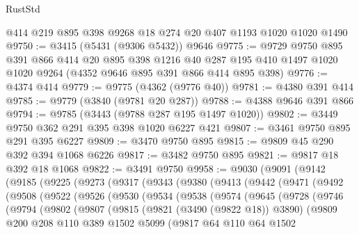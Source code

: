 \begin{lexlean}{RustStd}
\begin{coremodule}
{\begin{coremodule}
{{{{{{{{{{{{{{{{{{{{{{{{{{    @414
    @219
    @895
    @398
    @9268
    @18
    @274
    @20
    @407
    @1193
    @1020
    @1020
    @1490
@9750 := @3415 (@5431 (@9306 @5432)) @9646
@9775 := @9729
    @9750
    @895
    @391
    @866
    @414
    @20
    @895
    @398
    @1216
    @40
    @287
    @195
    @410
    @1497
    @1020
    @1020
    @9264
    (@4352 @9646 @895 @391 @866 @414 @895 @398)
@9776 := @4374 @414
@9779 := @9775 (@4362 (@9776 @40))
@9781 := @4380 @391 @414
@9785 := @9779 (@3840 (@9781 @20 @287))
@9788 := @4388 @9646 @391 @866
@9794 := @9785 (@3443 (@9788 @287 @195 @1497 @1020))
@9802 := @3449 @9750 @362 @291 @395 @398 @1020 @6227 @421
@9807 := @3461 @9750 @895 @291 @395 @6227
@9809 := @3470 @9750 @895
@9815 := @9809 @45 @290 @392 @394 @1068 @6226
@9817 := @3482 @9750 @895
@9821 := @9817 @18 @392 @18 @1068
@9822 := @3491 @9750
@9958 := @9030
    (@9091
      (@9142
        (@9185
          (@9225
            (@9273
              (@9317
                (@9343
                  (@9380
                    (@9413
                      (@9442
                        (@9471
                          (@9492
                            (@9508
                              (@9522
                                (@9526
                                  (@9530
                                    (@9534
                                      (@9538
                                        (@9574
                                          (@9645
                                            (@9728
                                              (@9746
                                                (@9794
                                                  (@9802
                                                    (@9807
                                                      (@9815
                                                        (@9821 (@3490 (@9822 @18)) @3890)
                                                        (@9809
                                                          @200
                                                          @208
                                                          @110
                                                          @389
                                                          @1502
                                                          @5099
                                                          (@9817
                                                            @64
                                                            @110
                                                            @64
                                                            @1502
}}}}}}}}}}}}}}}}}}}}}}}}}}
\end{coremodule}}
\end{coremodule}
\end{lexlean}
